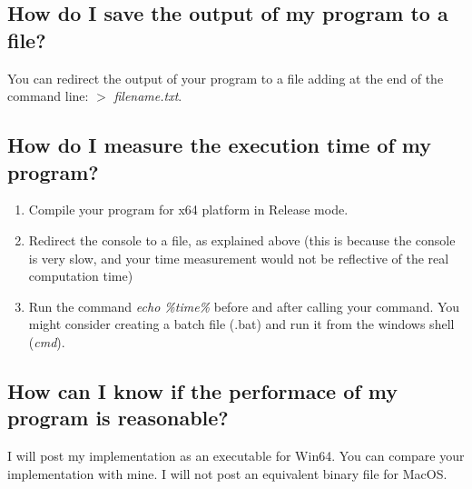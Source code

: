 \documentclass[10pt]{article}
\begin{document}
\subsection{How do I save the output of my program to a file?}
You can redirect the output of your program to a file adding at the end of the command line:  $>$ \textit{filename.txt}.
\subsection{How do I measure the execution time of my program?}
\begin{enumerate}
    \item Compile your program for x64 platform in Release mode.
    \item Redirect the console to a file, as explained above (this is because the console is very slow, and your time measurement would not be reflective of the real computation time)
    \item Run the command \textit{echo \%time\%} before and after calling your command. You might consider creating a batch file (.bat) and run it from the windows shell (\textit{cmd}).
\end{enumerate}
\subsection{How can I know if the performace of my program is reasonable?}
I will post my implementation as an executable for Win64. You can compare your implementation with mine. I will not post an equivalent binary file for MacOS.
\end{document}
